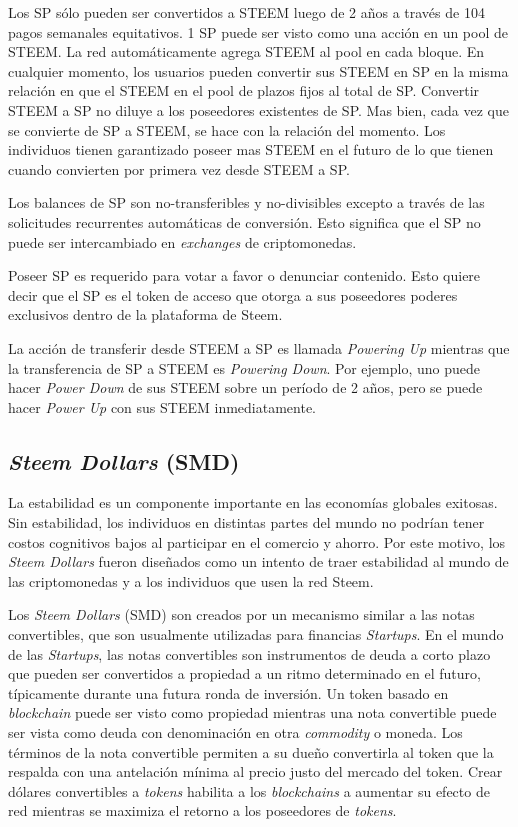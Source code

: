 \documentclass[a4paper,titlepage,final]{article}
\begin{document}
Los SP sólo pueden ser convertidos a STEEM luego de 2 años a través de 104 pagos semanales equitativos. 1 SP puede ser visto como una acción en un pool de STEEM. La red automáticamente agrega STEEM al pool en cada bloque. En cualquier momento, los usuarios pueden convertir sus STEEM en SP en la misma relación en que el STEEM en el pool de plazos fijos al total de SP. Convertir STEEM a SP no diluye a los poseedores existentes de SP. Mas bien, cada vez que se convierte de SP a STEEM, se hace con la relación del momento. Los individuos tienen garantizado poseer mas STEEM en el futuro de lo que tienen cuando convierten por primera vez desde STEEM a SP.

Los balances de SP son no-transferibles y no-divisibles excepto a través de las solicitudes recurrentes automáticas de conversión. Esto significa que el SP no puede ser intercambiado en \textit{exchanges} de criptomonedas.

Poseer SP es requerido para votar a favor o denunciar contenido. Esto quiere decir que el SP es el token de acceso que otorga a sus poseedores poderes exclusivos dentro de la plataforma de Steem.

La acción de transferir desde STEEM a SP es llamada \textit{Powering Up} mientras que la transferencia de SP a STEEM es \textit{Powering Down}. Por ejemplo, uno puede hacer \textit{Power Down} de sus STEEM sobre un período de 2 años, pero se puede hacer \textit{Power Up} con sus STEEM inmediatamente.

\subsection{\textit{Steem Dollars} (SMD)}

La estabilidad es un componente importante en las economías globales exitosas. Sin estabilidad, los individuos en distintas partes del mundo no podrían tener costos cognitivos bajos al participar en el comercio y ahorro. Por este motivo, los \textit{Steem Dollars} fueron diseñados como un intento de traer estabilidad al mundo de las criptomonedas y a los individuos que usen la red Steem.

Los \textit{Steem Dollars} (SMD) son creados por un mecanismo similar a las notas convertibles, que son usualmente utilizadas para financias \textit{Startups}. En el mundo de las \textit{Startups}, las notas convertibles son instrumentos de deuda a corto plazo que pueden ser convertidos a propiedad a un ritmo determinado en el futuro, típicamente durante una futura ronda de inversión. Un token basado en \textit{blockchain} puede ser visto como propiedad mientras una nota convertible puede ser vista como deuda con denominación en otra \textit{commodity} o moneda. Los términos de la nota convertible permiten a su dueño convertirla al token que la respalda con una antelación mínima al precio justo del mercado del token. Crear dólares convertibles a \textit{tokens} habilita a los \textit{blockchains} a aumentar su efecto de red mientras se maximiza el retorno a los poseedores de \textit{tokens}.
\end{document}
